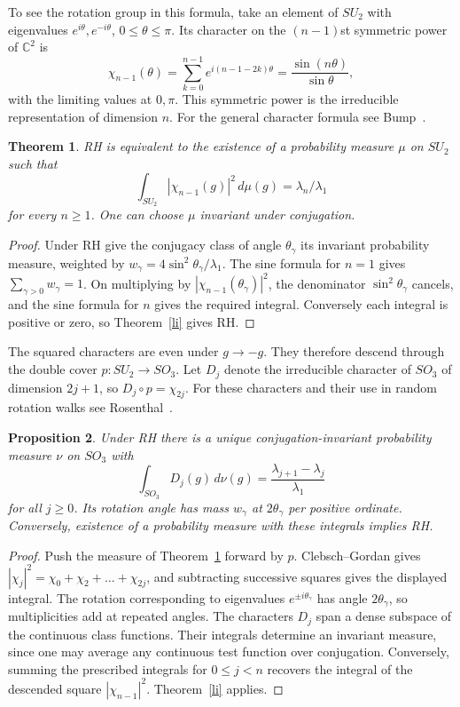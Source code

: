 \documentclass[11pt,a4paper]{article}
\newtheorem{thm}{Theorem}[section]
\newtheorem{prop}[thm]{Proposition}
\begin{document}
To see the rotation group in this formula, take an element of $SU_2$ with eigenvalues $e^{i\theta},e^{-i\theta}$, $0\leq\theta\leq\pi$. Its character on the $(n-1)$st symmetric power of $\mathbb C^2$ is
\[
 \chi_{n-1}(\theta)=\sum_{k=0}^{n-1}e^{i(n-1-2k)\theta}
                    =\frac{\sin(n\theta)}{\sin\theta},
\]
with the limiting values at $0,\pi$. This symmetric power is the irreducible representation of dimension $n$. For the general character formula see Bump~\cite{bump}.

\begin{samepage}
\begin{thm}\label{state}
RH is equivalent to the existence of a probability measure $\mu$ on $SU_2$ such that
\[
 \int_{SU_2}|\chi_{n-1}(g)|^2\,d\mu(g)=\lambda_n/\lambda_1
\]
for every $n\geq1$. One can choose $\mu$ invariant under conjugation.
\end{thm}
\end{samepage}
\begin{proof}
Under RH give the conjugacy class of angle $\theta_\gamma$ its invariant probability measure, weighted by $w_\gamma=4\sin^2\theta_\gamma/\lambda_1$. The sine formula for $n=1$ gives $\sum_{\gamma>0} w_\gamma=1$. On multiplying by $|\chi_{n-1}(\theta_\gamma)|^2$, the denominator $\sin^2\theta_\gamma$ cancels, and the sine formula for $n$ gives the required integral. Conversely each integral is positive or zero, so Theorem~\ref{li} gives RH.
\end{proof}

The squared characters are even under $g\to-g$. They therefore descend through the double cover $p:SU_2\to SO_3$. Let $D_j$ denote the irreducible character of $SO_3$ of dimension $2j+1$, so $D_j\circ p=\chi_{2j}$. For these characters and their use in random rotation walks see Rosenthal~\cite{rosenthal}.

\begin{samepage}
\begin{prop}\label{rot}
Under RH there is a unique conjugation-invariant probability measure $\nu$ on $SO_3$ with
\[
 \int_{SO_3}D_j(g)\,d\nu(g)=\frac{\lambda_{j+1}-\lambda_j}{\lambda_1}
\]
for all $j\geq0$. Its rotation angle has mass $w_\gamma$ at $2\theta_\gamma$ per positive ordinate. Conversely, existence of a probability measure with these integrals implies RH.
\end{prop}
\end{samepage}
\begin{proof}
Push the measure of Theorem~\ref{state} forward by $p$. Clebsch--Gordan gives $|\chi_j|^2=\chi_0+\chi_2+\ldots+\chi_{2j}$, and subtracting successive squares gives the displayed integral. The rotation corresponding to eigenvalues $e^{\pm i\theta_\gamma}$ has angle $2\theta_\gamma$, so multiplicities add at repeated angles. The characters $D_j$ span a dense subspace of the continuous class functions. Their integrals determine an invariant measure, since one may average any continuous test function over conjugation. Conversely, summing the prescribed integrals for $0\leq j<n$ recovers the integral of the descended square $|\chi_{n-1}|^2$. Theorem~\ref{li} applies.
\end{proof}
\end{document}
